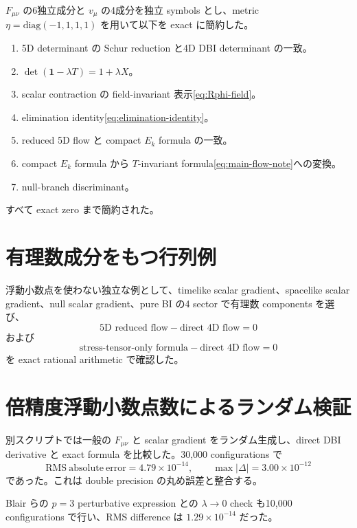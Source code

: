\documentclass[a4paper,11pt]{ltjsreport}
\newcommand{\Id}{\mathbf 1}
\begin{document}
$F_{\mu\nu}$ の6独立成分と $v_\mu$ の4成分を独立 symbols とし、metric $\eta=\mathrm{diag}(-1,1,1,1)$ を用いて以下を exact に簡約した。
\begin{enumerate}[label=(\arabic*)]
 \item 5D determinant の Schur reduction と4D DBI determinant の一致。
 \item $\det(\Id-\lambda T)=1+\lambda X$。
 \item scalar contraction の field-invariant 表示\eqref{eq:Rphi-field}。
 \item elimination identity\eqref{eq:elimination-identity}。
 \item reduced 5D flow と compact $E_k$ formula の一致。
 \item compact $E_k$ formula から $T$-invariant formula\eqref{eq:main-flow-note}への変換。
 \item null-branch discriminant。
\end{enumerate}
すべて exact zero まで簡約された。

\section{有理数成分をもつ行列例}

浮動小数点を使わない独立な例として、timelike scalar gradient、spacelike scalar gradient、null scalar gradient、pure BI の4 sector で有理数 components を選び、
\begin{equation}
 \text{5D reduced flow}-\text{direct 4D flow}=0
\end{equation}
および
\begin{equation}
 \text{stress-tensor-only formula}-\text{direct 4D flow}=0
\end{equation}
を exact rational arithmetic で確認した。

\section{倍精度浮動小数点数によるランダム検証}

別スクリプトでは一般の $F_{\mu\nu}$ と scalar gradient をランダム生成し、direct DBI derivative と exact formula を比較した。30,000 configurations で
\begin{equation}
 \mathrm{RMS\ absolute\ error}=4.79\times10^{-14},
 \qquad
 \max |\Delta|=3.00\times10^{-12}
\end{equation}
であった。これは double precision の丸め誤差と整合する。

Blair らの $p=3$ perturbative expression との $\lambda\to0$ check も10,000 configurations で行い、RMS difference は $1.29\times10^{-14}$ だった。
\end{document}
